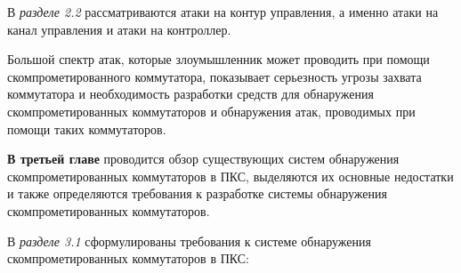 \documentclass[14pt,autoref,href]{disser}
\theoremstyle{definition}
\begin{document}
В \emph{разделе 2.2} рассматриваются атаки на контур управления, а именно атаки на канал управления и атаки на контроллер.

Большой спектр атак, которые злоумышленник может проводить при помощи скомпрометированного коммутатора, показывает серьезность угрозы захвата коммутатора и необходимость разработки средств для обнаружения скомпрометированных коммутаторов и обнаружения атак, проводимых при помощи таких коммутаторов.

\textbf{В третьей главе} проводится обзор существующих систем обнаружения скомпрометированных коммутаторов в ПКС, выделяются их основные недостатки и также определяются требования к разработке системы обнаружения скомпрометированных коммутаторов.

В \emph{разделе 3.1} сформулированы требования к системе обнаружения скомпрометированных коммутаторов в ПКС:
\end{document}
